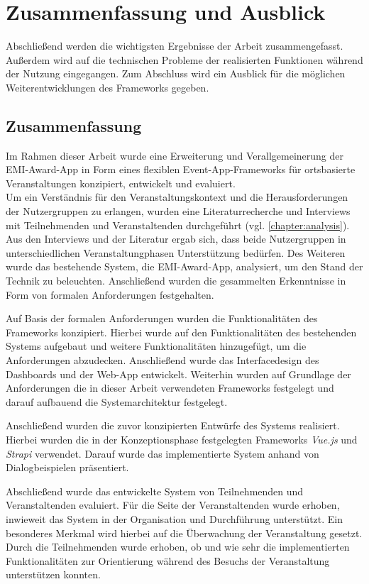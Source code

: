 \chapter{Zusammenfassung und Ausblick} \label{chapter:summary}

Abschließend werden die wichtigsten Ergebnisse der Arbeit zusammengefasst.
Außerdem wird auf die technischen Probleme der realisierten Funktionen während
der Nutzung eingegangen. Zum Abschluss wird ein Ausblick für die möglichen
Weiterentwicklungen des Frameworks gegeben.

\section{Zusammenfassung}

Im Rahmen dieser Arbeit wurde eine Erweiterung und Verallgemeinerung der
EMI-Award-App in Form eines flexiblen Event-App-Frameworks für ortsbasierte
Veranstaltungen konzipiert, entwickelt und evaluiert.
\\
Um ein Verständnis für den Veranstaltungskontext und die Herausforderungen der
Nutzergruppen zu erlangen, wurden eine Literaturrecherche und Interviews mit
Teilnehmenden und Veranstaltenden durchgeführt (vgl.
\autoref{chapter:analysis}). Aus den Interviews und der Literatur ergab sich,
dass beide Nutzergruppen in unterschiedlichen Veranstaltungphasen Unterstützung
bedürfen. Des Weiteren wurde das bestehende System, die EMI-Award-App,
analysiert, um den Stand der Technik zu beleuchten. Anschließend wurden die
gesammelten Erkenntnisse in Form von formalen Anforderungen festgehalten.

Auf Basis der formalen Anforderungen wurden die Funktionalitäten des Frameworks
konzipiert. Hierbei wurde auf den Funktionalitäten des bestehenden Systems
aufgebaut und weitere Funktionalitäten hinzugefügt, um die Anforderungen
abzudecken. Anschließend wurde das Interfacedesign des Dashboards und der
Web-App entwickelt. Weiterhin wurden auf Grundlage der Anforderungen die in
dieser Arbeit verwendeten Frameworks festgelegt und darauf aufbauend die
Systemarchitektur festgelegt.

Anschließend wurden die zuvor konzipierten Entwürfe des Systems realisiert.
Hierbei wurden die in der Konzeptionsphase festgelegten Frameworks
\textit{Vue.js} und \textit{Strapi} verwendet. Darauf wurde das implementierte
System anhand von Dialogbeispielen präsentiert.

Abschließend wurde das entwickelte System von Teilnehmenden und
Veranstaltenden evaluiert. Für die Seite der Veranstaltenden wurde erhoben,
inwieweit das System in der Organisation und Durchführung unterstützt. Ein
besonderes Merkmal wird hierbei auf die Überwachung der Veranstaltung gesetzt.
Durch die Teilnehmenden wurde erhoben, ob und wie sehr die implementierten
Funktionalitäten zur Orientierung während des Besuchs der Veranstaltung
unterstützen konnten.

